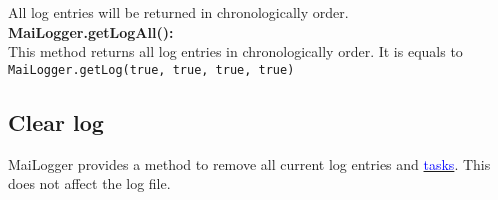 \documentclass{article}
\newcommand{\refh}[2]{\hyperref[#1] {\textcolor{blue}{#2}}}
\begin{document}
    All log entries will be returned in chronologically order. \\

    \textbf{MaiLogger.getLogAll():} \\
    This method returns all log entries in chronologically order.
    It is equals to \lstinline|MaiLogger.getLog(true, true, true, true)|

    \subsection{Clear log}
    \label{other_clear}
    MaiLogger provides a method to remove all current log entries and \refh{tasks}{tasks}.
    This does not affect the log file.
\end{document}
